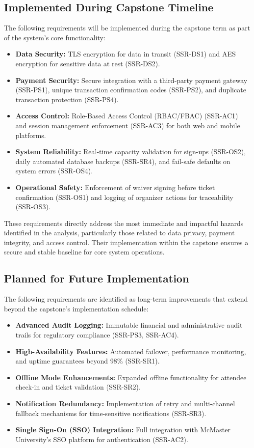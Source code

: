 \documentclass{article}
\begin{document}
\subsection*{Implemented During Capstone Timeline}
The following requirements will be implemented during the capstone term as part of the system’s core functionality:
\begin{itemize}
    \item \textbf{Data Security:} TLS encryption for data in transit (SSR-DS1) and AES encryption for sensitive data at rest (SSR-DS2).
    \item \textbf{Payment Security:} Secure integration with a third-party payment gateway (SSR-PS1), unique transaction confirmation codes (SSR-PS2), and duplicate transaction protection (SSR-PS4).
    \item \textbf{Access Control:} Role-Based Access Control (RBAC/FBAC) (SSR-AC1) and session management enforcement (SSR-AC3) for both web and mobile platforms.
    \item \textbf{System Reliability:} Real-time capacity validation for sign-ups (SSR-OS2), daily automated database backups (SSR-SR4), and fail-safe defaults on system errors (SSR-OS4).
    \item \textbf{Operational Safety:} Enforcement of waiver signing before ticket confirmation (SSR-OS1) and logging of organizer actions for traceability (SSR-OS3).
\end{itemize}

These requirements directly address the most immediate and impactful hazards identified in the analysis, particularly those related to data privacy, payment integrity, and access control. Their implementation within the capstone ensures a secure and stable baseline for core system operations.

\subsection*{Planned for Future Implementation}
The following requirements are identified as long-term improvements that extend beyond the capstone’s implementation schedule:
\begin{itemize}
    \item \textbf{Advanced Audit Logging:} Immutable financial and administrative audit trails for regulatory compliance (SSR-PS3, SSR-AC4).
    \item \textbf{High-Availability Features:} Automated failover, performance monitoring, and uptime guarantees beyond 98\% (SSR-SR1).
    \item \textbf{Offline Mode Enhancements:} Expanded offline functionality for attendee check-in and ticket validation (SSR-SR2).
    \item \textbf{Notification Redundancy:} Implementation of retry and multi-channel fallback mechanisms for time-sensitive notifications (SSR-SR3).
    \item \textbf{Single Sign-On (SSO) Integration:} Full integration with McMaster University’s SSO platform for authentication (SSR-AC2).
\end{itemize}
\end{document}

